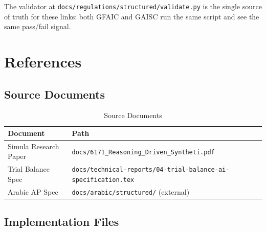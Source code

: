 \documentclass[11pt,a4paper]{article}
\begin{document}
The validator at
\texttt{docs/regulations/structured/validate.py} is the single source
of truth for these links: both GFAIC and GAISC run the same
script and see the same pass/fail signal.

\newpage
\section{References}
\label{chap:references}

\subsection{Source Documents}

\begin{table}[H]
\centering
\caption{Source Documents}
\begin{tabularx}{\textwidth}{lX}
\toprule
\textbf{Document} & \textbf{Path} \\
\midrule
Simula Research Paper & \texttt{docs/6171\_Reasoning\_Driven\_Syntheti.pdf} \\
Trial Balance Spec & \texttt{docs/technical-reports/04-trial-balance-ai-specification.tex} \\
Arabic AP Spec & \texttt{docs/arabic/structured/} (external) \\
\bottomrule
\end{tabularx}
\end{table}

\subsection{Implementation Files}
\end{document}
